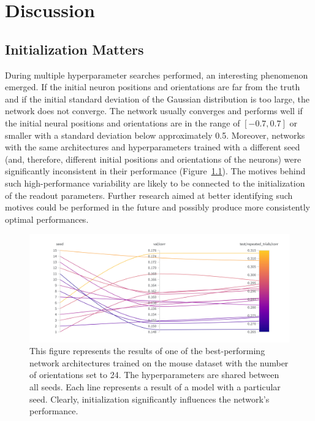 \chapter{Discussion}

\section{Initialization Matters}

During multiple hyperparameter searches performed, an interesting phenomenon emerged. If the initial neuron positions and orientations are far from the truth and if the initial standard deviation of the Gaussian distribution is too large, the network does not converge. The network usually converges and performs well if the initial neural positions and orientations are in the range of $[-0.7, 0.7]$ or smaller with a standard deviation below approximately 0.5. Moreover, networks with the same architectures and hyperparameters trained with a different seed (and, therefore, different initial positions and orientations of the neurons) were significantly inconsistent in their performance (Figure~\ref{initialization_matters}). The motives behind such high-performance variability are likely to be connected to the initialization of the readout parameters. Further research aimed at better identifying such motives could be performed in the future and possibly produce more consistently optimal performances.

\begin{figure}[H]\centering
	\includegraphics[width=150mm]{../img/initialization_matters.png}
	\caption{This figure represents the results of one of the best-performing network architectures trained on the mouse dataset with the number of orientations set to 24. The hyperparameters are shared between all seeds. Each line represents a result of a model with a particular seed. Clearly, initialization significantly influences the network’s performance.}
	\label{initialization_matters}
\end{figure}

